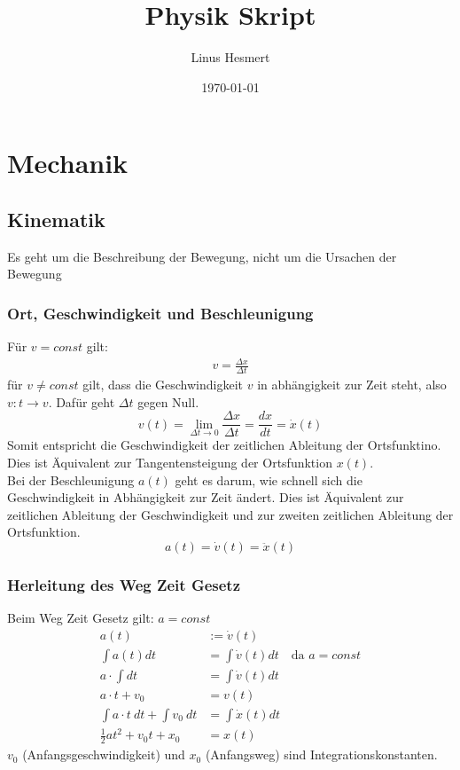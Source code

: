 \documentclass{article}
\title{Physik Skript}
\author{Linus Hesmert}
\date{\today}
\begin{document}
\maketitle
\tableofcontents
\newpage

\section{Mechanik}
\subsection{Kinematik}
Es geht um die Beschreibung der Bewegung, nicht um die Ursachen der Bewegung

\subsubsection{Ort, Geschwindigkeit und Beschleunigung}
Für $v=const$ gilt:
\begin{align}
    v=\frac{\Delta x}{\Delta t}
\end{align}
für $v\neq const$ gilt, dass die Geschwindigkeit $v$ in abhängigkeit
zur Zeit steht, also $v: t\to v$. Dafür geht $\Delta t$ gegen Null.
\begin{equation}
    v(t)=\lim_{\Delta t\to 0} \frac{\Delta x}{\Delta t}=\frac{dx}{dt}=\dot{x}(t)
\end{equation}
Somit entspricht die Geschwindigkeit der zeitlichen Ableitung der Ortsfunktino.
Dies ist Äquivalent zur Tangentensteigung der Ortsfunktion $x(t)$.\\

\noindent Bei der Beschleunigung $a(t)$ geht es darum, wie schnell sich die Geschwindigkeit
in Abhängigkeit zur Zeit ändert. Dies ist Äquivalent zur zeitlichen Ableitung der Geschwindigkeit
und zur zweiten zeitlichen Ableitung der Ortsfunktion.
\[a(t)=\dot{v}(t)=\ddot{x}(t)\]

\subsubsection{Herleitung des Weg Zeit Gesetz}
Beim Weg Zeit Gesetz gilt: $a=const$
\begin{align}
    a(t)&:=\dot{v}(t)\\
    \int a(t)dt&=\int \dot{v}(t)dt \quad \text{da }a=const\\
    a\cdot \int dt&=\int \dot{v}(t)dt\\
    a\cdot t+v_0&=v(t)\\
    \int a\cdot t \ dt+ \int v_0 \ dt&=\int \dot{x}(t) dt\\
    \frac{1}{2}at^2+v_0t+x_0&=x(t)
\end{align}
$v_0$ (Anfangsgeschwindigkeit) und $x_0$ (Anfangsweg) sind Integrationskonstanten.
\end{document}
